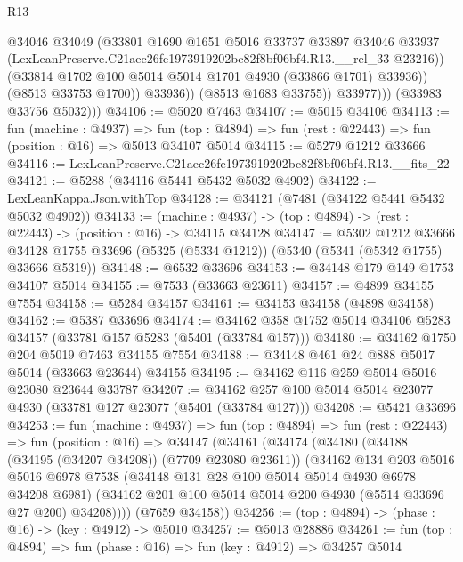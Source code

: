 \begin{lexlean}{R13}
\begin{coremodule}
                        @34046
                        @34049
                        (@33801
                          @1690
                          @1651
                          @5016
                          @33737
                          @33897
                          @34046
                          @33937
                          (LexLeanPreserve.C21aec26fe1973919202bc82f8bf06bf4.R13.__rel_33 @23216))
                        (@33814 @1702 @100 @5014 @5014 @1701 @4930 (@33866 @1701) @33936))
                      (@8513 @33753 @1700))
                    @33936))
                (@8513 @1683 @33755))
              @33977)))
        (@33983 @33756 @5032)))
@34106 := @5020 @7463
@34107 := @5015 @34106
@34113 := fun (machine : @4937) =>
  fun (top : @4894) => fun (rest : @22443) => fun (position : @16) => @5013 @34107 @5014
@34115 := @5279 @1212 @33666
@34116 := LexLeanPreserve.C21aec26fe1973919202bc82f8bf06bf4.R13.__fits_22
@34121 := @5288 (@34116 @5441 @5432 @5032 @4902)
@34122 := LexLeanKappa.Json.withTop
@34128 := @34121 (@7481 (@34122 @5441 @5432 @5032 @4902))
@34133 := (machine : @4937) -> (top : @4894) -> (rest : @22443) -> (position : @16) -> @34115 @34128
@34147 := @5302
    @1212
    @33666
    @34128
    @1755
    @33696
    (@5325 (@5334 @1212))
    (@5340 (@5341 (@5342 @1755) @33666 @5319))
@34148 := @6532 @33696
@34153 := @34148 @179 @149 @1753 @34107 @5014
@34155 := @7533 (@33663 @23611)
@34157 := @4899 @34155 @7554
@34158 := @5284 @34157
@34161 := @34153 @34158 (@4898 @34158)
@34162 := @5387 @33696
@34174 := @34162 @358 @1752 @5014 @34106 @5283 @34157 (@33781 @157 @5283 (@5401 (@33784 @157)))
@34180 := @34162 @1750 @204 @5019 @7463 @34155 @7554
@34188 := @34148 @461 @24 @888 @5017 @5014 (@33663 @23644) @34155
@34195 := @34162 @116 @259 @5014 @5016 @23080 @23644 @33787
@34207 := @34162 @257 @100 @5014 @5014 @23077 @4930 (@33781 @127 @23077 (@5401 (@33784 @127)))
@34208 := @5421 @33696
@34253 := fun (machine : @4937) =>
  fun (top : @4894) =>
  fun (rest : @22443) =>
  fun (position : @16) =>
  @34147
    (@34161
      (@34174
        (@34180
          (@34188 (@34195 (@34207 @34208)) (@7709 @23080 @23611))
          (@34162
            @134
            @203
            @5016
            @5016
            @6978
            @7538
            (@34148 @131 @28 @100 @5014 @5014 @4930 @6978 @34208 @6981)
            (@34162 @201 @100 @5014 @5014 @200 @4930 (@5514 @33696 @27 @200) @34208))))
      (@7659 @34158))
@34256 := (top : @4894) -> (phase : @16) -> (key : @4912) -> @5010
@34257 := @5013 @28886
@34261 := fun (top : @4894) => fun (phase : @16) => fun (key : @4912) => @34257 @5014

\end{coremodule}
\end{lexlean}
